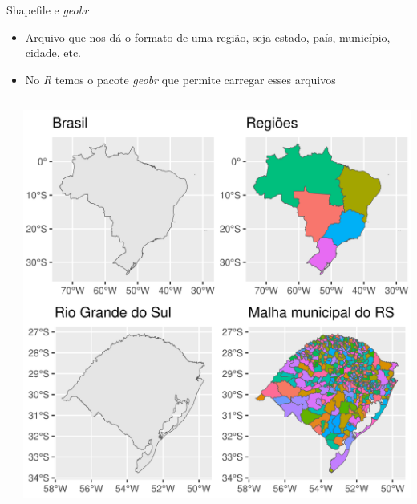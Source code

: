 \documentclass[aspectratio=1610]{beamer}
\begin{document}
\begin{frame}{Shapefile e \textit{geobr}}
    \begin{itemize}
        \item Arquivo que nos dá o formato de uma região, seja estado, país, município, cidade, etc.
        \item No \textit{R} temos o pacote \textit{geobr} que permite carregar esses arquivos
    \end{itemize}
    \pause
    \begin{columns}
        \begin{column}{0.55\textwidth}
            \begin{tcolorbox}[title=Código,colback=wcprimary10,colbacktitle=wcprimary,colframe=white,fontlower=\small]
            \end{tcolorbox} 
        \end{column}
        \begin{column}{0.45\textwidth}
            \includegraphics[width=\textwidth]{plots_geobr.png}
        \end{column}
    \end{columns}
\end{frame}
\end{document}
